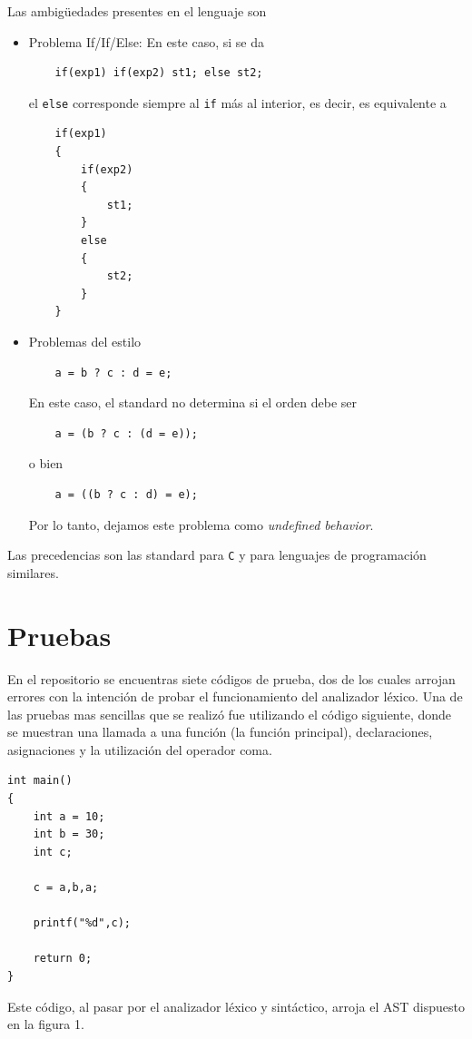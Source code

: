 \documentclass[12pt]{article}
\begin{document}
Las ambig\"uedades presentes en el lenguaje son
\begin{itemize}
    \item Problema If/If/Else: En este caso, si se da
    \begin{verbatim}
    if(exp1) if(exp2) st1; else st2;
    \end{verbatim}
    el \texttt{else} corresponde siempre al \texttt{if} m\'as al interior, es decir, es equivalente a
    \begin{verbatim}
    if(exp1)
    {
        if(exp2)
        {
            st1;
        }
        else
        {
            st2;
        }
    }
    \end{verbatim}
    \item Problemas del estilo
    \begin{verbatim}
    a = b ? c : d = e;
    \end{verbatim}
    En este caso, el standard no determina si el orden debe ser
    \begin{verbatim}
    a = (b ? c : (d = e));
    \end{verbatim}
    o bien
    \begin{verbatim}
    a = ((b ? c : d) = e);
    \end{verbatim}
    Por lo tanto, dejamos este problema como \textit{undefined behavior}.
\end{itemize}

Las precedencias son las standard para \texttt{C} y para lenguajes de programaci\'on similares.

\section*{Pruebas}
En el repositorio se encuentras siete c\'odigos de prueba, dos de los cuales arrojan errores con la intenci\'on de probar el funcionamiento del analizador l\'exico.
Una de las pruebas mas sencillas que se realiz\'o fue utilizando el c\'odigo siguiente, donde se muestran una llamada a una funci\'on (la funci\'on principal), declaraciones, asignaciones y la utilizaci\'on del operador coma. 
\begin{verbatim}
int main()
{
    int a = 10;
    int b = 30;
    int c;
    
    c = a,b,a;
    
    printf("%d",c);

    return 0;
}
\end{verbatim}
Este c\'odigo, al pasar por el analizador l\'exico y sint\'actico, arroja el AST dispuesto en la figura 1.
\end{document}
